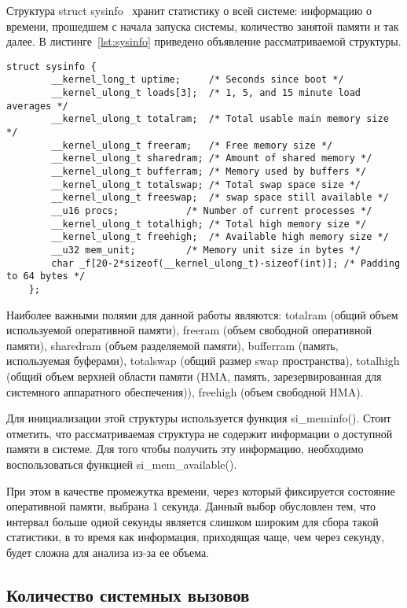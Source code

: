 Структура struct sysinfo~\cite{sysinfo} хранит статистику о всей системе: информацию о времени, прошедшем с начала запуска системы, количество занятой памяти и так далее. В листинге~\ref{lst:sysinfo} приведено объявление рассматриваемой структуры.

\begin{lstlisting}[label={lst:sysinfo}, caption={структура struct sysinfo}]
	struct sysinfo {
		__kernel_long_t uptime;		/* Seconds since boot */
		__kernel_ulong_t loads[3];	/* 1, 5, and 15 minute load averages */
		__kernel_ulong_t totalram;	/* Total usable main memory size */
		__kernel_ulong_t freeram;	/* Free memory size */
		__kernel_ulong_t sharedram;	/* Amount of shared memory */
		__kernel_ulong_t bufferram;	/* Memory used by buffers */
		__kernel_ulong_t totalswap;	/* Total swap space size */
		__kernel_ulong_t freeswap;	/* swap space still available */
		__u16 procs;		   	/* Number of current processes */
		__kernel_ulong_t totalhigh;	/* Total high memory size */
		__kernel_ulong_t freehigh;	/* Available high memory size */
		__u32 mem_unit;			/* Memory unit size in bytes */
		char _f[20-2*sizeof(__kernel_ulong_t)-sizeof(int)];	/* Padding to 64 bytes */
	};
\end{lstlisting}

Наиболее важными полями для данной работы являются: totalram (общий объем используемой оперативной памяти), freeram (объем свободной оперативной памяти), sharedram (объем разделяемой памяти), bufferram (память, используемая буферами), totalswap (общий размер swap пространства), totalhigh (общий объем верхней области памяти (HMA, память, зарезервированная для системного аппаратного обеспечения)), freehigh (объем свободной HMA).

Для инициализации этой структуры используется функция si\_meminfo(). Стоит отметить, что рассматриваемая структура не содержит информации о доступной памяти в системе. Для того чтобы получить эту информацию, необходимо воспользоваться функцией si\_mem\_available().

При этом в качестве промежутка времени, через который фиксируется состояние оперативной памяти, выбрана 1 секунда. Данный выбор обусловлен тем, что интервал больше одной секунды является слишком широким для сбора такой статистики, в то время как информация, приходящая чаще, чем через секунду, будет сложна для анализа из-за ее объема.

\newpage

\subsection{Количество системных вызовов}

